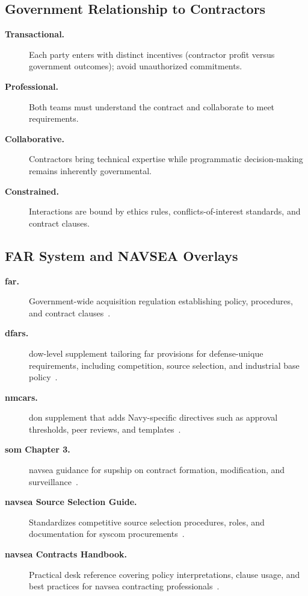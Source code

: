 \documentclass[../main.tex]{subfiles}
\begin{document}
\subsection{Government Relationship to Contractors}
\begin{description}
	\item[\textbf{Transactional.}]  Each party enters with distinct incentives (contractor profit versus government outcomes); avoid unauthorized commitments.
	\item[\textbf{Professional.}]  Both teams must understand the contract and collaborate to meet requirements.
	\item[\textbf{Collaborative.}] Contractors bring technical expertise while programmatic decision-making remains inherently governmental.
	\item[\textbf{Constrained.}]  Interactions are bound by ethics rules, conflicts-of-interest standards, and contract clauses.
\end{description}

\subsection{FAR System and NAVSEA Overlays}
\begin{description}
\item[\textbf{\ac{far}.}] Government-wide acquisition regulation establishing policy, procedures, and contract clauses~\autocite{FAR}.
\item[\textbf{\ac{dfars}.}] \ac{dow}-level supplement tailoring \ac{far} provisions for defense-unique requirements, including competition, source selection, and industrial base policy~\autocite{DFARS}.
\item[\textbf{\ac{nmcars}.}] \ac{don} supplement that adds Navy-specific directives such as approval thresholds, peer reviews, and templates~\autocite{NMCARS}.
\item[\textbf{\ac{som} Chapter 3.}] \ac{navsea} guidance for \ac{supship} on contract formation, modification, and surveillance~\autocite{SOM-Ch3-2023}.
\item[\textbf{\ac{navsea} Source Selection Guide.}] Standardizes competitive source selection procedures, roles, and documentation for \ac{syscom} procurements~\autocite{NAVSEA-Source-Selection-Guide-2022}.
\item[\textbf{\ac{navsea} Contracts Handbook.}] Practical desk reference covering policy interpretations, clause usage, and best practices for \ac{navsea} contracting professionals~\autocite{NAVSEA-Contracts-Handbook-2023}.
\end{description}
\end{document}
